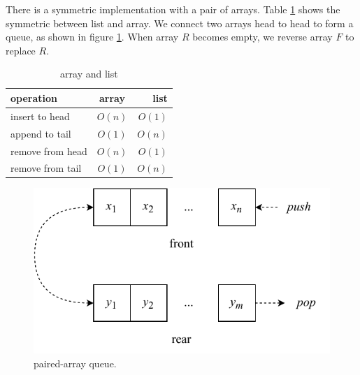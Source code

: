 \documentclass[b5paper]{article}
\begin{document}

There is a symmetric implementation with a pair of arrays. Table \cref{tab:array-list-comp} shows the symmetric between list and array. We connect two arrays head to head to form a queue, as shown in figure \cref{fig:horseshoe-array}. When array $R$ becomes empty, we reverse array $F$ to replace $R$.

\begin{table}[htbp]
\centering
\begin{tabular}{l | c | r}
  \hline
  operation & array & list \\
  \hline
  insert to head & $O(n)$ & $O(1)$ \\
  append to tail & $O(1)$ & $O(n)$ \\
  remove from head & $O(n)$ & $O(1)$ \\
  remove from tail & $O(1)$ & $O(n)$ \\
  \hline
\end{tabular}
\caption{array and list}
\label{tab:array-list-comp}
\end{table}

\begin{figure}[htbp]
  \centering
  \includegraphics[scale=0.6]{img/paired-arrayq}
  \caption{paired-array queue.}
  \label{fig:horseshoe-array}
\end{figure}

\begin{Exercise}
\end{Exercise}
\end{document}
